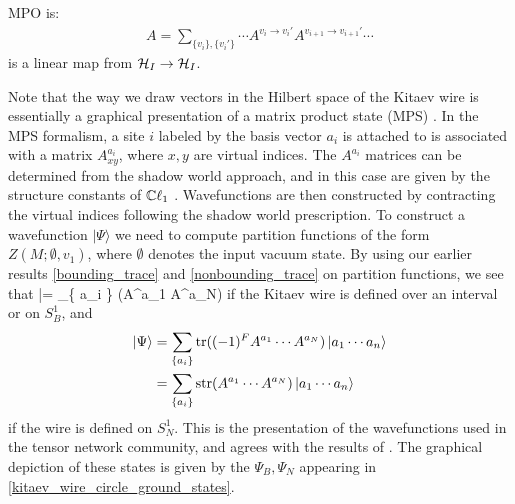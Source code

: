 MPO is:
\begin{align}
A = \sum_{\{ v_{i} \} , \{v_i'\}} \cdots A^{v_i \to v_i' } A^{v_{i+1} \to v_{i+1}'} \cdots
\end{align}
is a linear map from $\mathcal{H}_I \to \mathcal{H}_I$.

Note that the way we draw vectors in the Hilbert space of the Kitaev wire is essentially a graphical presentation of a matrix product state (MPS)
. 
In the MPS formalism, a site $i$ labeled by the basis vector $a_i$ is attached 
to is associated with a matrix $A^{a_i}_{xy}$, where $x,y$ are virtual indices. 
The $A^{a_i}$ matrices can be determined from the shadow world approach, and in this case are given by the structure constants of $\mathbb{C}\ell_1$ \cite{turzillo2016}. 
Wavefunctions are then constructed by contracting the virtual indices following the 
shadow world prescription. To construct a wavefunction $|\Psi\rangle$ we need to compute 
partition functions of the form $Z(M;\emptyset,v_1)$, where $\emptyset$ denotes 
the input vacuum state. 
By using our earlier results \eqref{bounding_trace} and \eqref{nonbounding_trace} on 
partition functions, we see that 
\be |\Psi\rangle = \sum_{\{ a_i \} }\tr(A^{a_1} \cdots A^{a_N})  \ee
if the Kitaev wire is defined over an interval or on $S^1_B$, and 
\begin{align}
 |\Psi\rangle & = \sum_{\{ a_i \} }\text{tr}((-1)^FA^{a_1} \cdots A^{a_N}) \left|a_1 \cdots a_n\right\rangle \\ 
 & =\sum_{\{ a_i \} }\text{str}(A^{a_1} \cdots A^{a_N}) \left|a_1 \cdots a_n\right\rangle 
 \end{align}
if the wire is defined on $S^1_N$. 
This is the presentation of the wavefunctions used in the tensor network community, 
and agrees with the results of \cite{turzillo2016,bultinck2017b}. 
The graphical depiction of these states is given by the $\Psi_B,\Psi_N$ appearing in \eqref{kitaev_wire_circle_ground_states}. 

